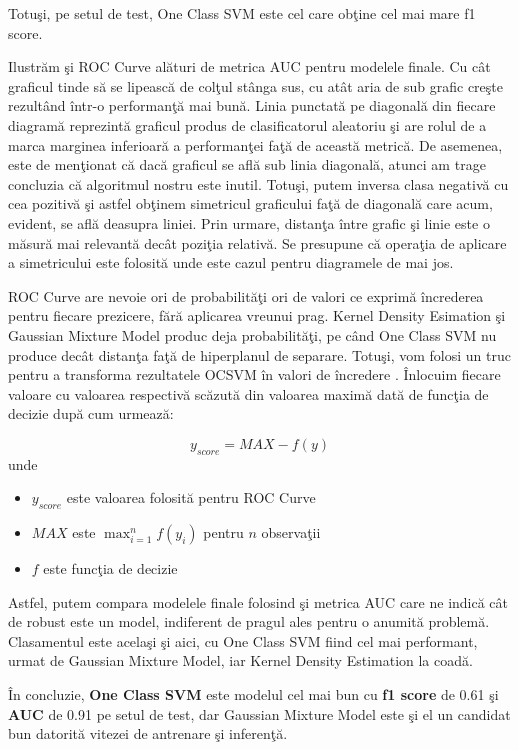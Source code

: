 Totuşi, pe setul de test, One Class SVM este cel care obţine cel mai mare f1 score.

Ilustrăm şi ROC Curve alături de metrica AUC pentru modelele finale. Cu cât graficul 
tinde să se lipească de colţul stânga sus, cu atât aria de sub grafic creşte rezultând 
într-o performanţă mai bună. Linia punctată pe diagonală 
din fiecare diagramă reprezintă graficul produs de clasificatorul aleatoriu şi are rolul
de a marca marginea inferioară a performanţei faţă de această metrică. De asemenea, este 
de menţionat că dacă graficul se află sub linia diagonală, atunci am trage concluzia că
algoritmul nostru este inutil. Totuşi, putem inversa clasa negativă cu cea pozitivă şi 
astfel obţinem simetricul graficului faţă de diagonală care acum, evident, se află deasupra
liniei. Prin urmare, distanţa între grafic şi linie este o măsură mai relevantă decât poziţia
relativă. Se presupune că operaţia de aplicare a simetricului este folosită unde este cazul 
pentru diagramele de mai jos.

ROC Curve are nevoie ori de probabilităţi ori de valori ce exprimă încrederea pentru fiecare 
prezicere, fără aplicarea vreunui prag. Kernel Density Esimation şi Gaussian Mixture Model 
produc deja probabilităţi, pe când One Class SVM nu produce decât distanţa faţă de hiperplanul
de separare. Totuşi, vom folosi un truc pentru a transforma rezultatele OCSVM în valori 
de încredere \cite{stackoverflow-auc}. Înlocuim fiecare valoare cu valoarea respectivă scăzută din valoarea maximă
dată de funcţia de decizie după cum urmează:

$$y_{score} = MAX - f(y)$$
unde 

\begin{itemize}
    \item $y_{score}$ este valoarea folosită pentru ROC Curve
    \item $MAX$ este $\max_{i=1}^{n} f(y_{i})$ pentru $n$ observaţii
    \item $f$ este funcţia de decizie 
\end{itemize}

Astfel, putem compara modelele finale folosind şi metrica AUC care ne 
indică cât de robust este un model, indiferent de pragul ales pentru 
o anumită problemă. Clasamentul este acelaşi şi aici,
cu One Class SVM fiind cel mai performant, urmat de Gaussian Mixture
Model, iar Kernel Density Estimation la coadă.

În concluzie, \textbf{One Class SVM} este modelul cel mai bun cu \textbf{f1 score}
de 0.61 şi 
\textbf{AUC} de 0.91 pe setul de test, 
dar Gaussian Mixture Model este şi el un candidat
bun datorită vitezei de antrenare şi inferenţă.

